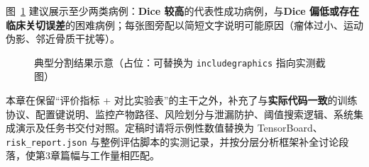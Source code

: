 图~\ref{fig:case_study} 建议展示至少两类病例：\textbf{Dice 较高}的代表性成功病例，与\textbf{Dice 偏低或存在临床关切误差}的困难病例；每张图旁配以简短文字说明可能原因（瘤体过小、运动伪影、邻近骨质干扰等）。

\begin{figure}[htbp]
	\centering
	\caption{典型分割结果示意（占位：可替换为 \texttt{includegraphics} 指向实测截图）}
	\label{fig:case_study}
\end{figure}

本章在保留“评价指标 + 对比实验表”的主干之外，补充了与\textbf{实际代码一致}的训练协议、配置键说明、监控产物路径、风险划分与泄漏防护、阈值搜索逻辑、系统集成演示及任务书交付对照。定稿时请将示例性数值替换为 TensorBoard、\texttt{risk\_report.json} 与整例评估脚本的实测记录，并按分层分析框架补全讨论段落，使第3章篇幅与工作量相匹配。
